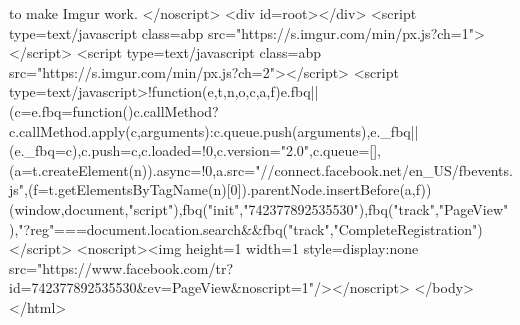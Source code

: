 to make Imgur work. </noscript> <div id=root></div> <script type=text/javascript class=abp src="https://s.imgur.com/min/px.js?ch=1"></script> <script type=text/javascript class=abp src="https://s.imgur.com/min/px.js?ch=2"></script> <script type=text/javascript>!function(e,t,n,o,c,a,f){e.fbq||(c=e.fbq=function(){c.callMethod?c.callMethod.apply(c,arguments):c.queue.push(arguments)},e._fbq||(e._fbq=c),c.push=c,c.loaded=!0,c.version="2.0",c.queue=[],(a=t.createElement(n)).async=!0,a.src="//connect.facebook.net/en_US/fbevents.js",(f=t.getElementsByTagName(n)[0]).parentNode.insertBefore(a,f))}(window,document,"script"),fbq("init","742377892535530"),fbq("track","PageView"),"?reg"===document.location.search&&fbq("track","CompleteRegistration")</script> <noscript><img height=1 width=1 style=display:none src="https://www.facebook.com/tr?id=742377892535530&ev=PageView&noscript=1"/></noscript> </body> </html> 